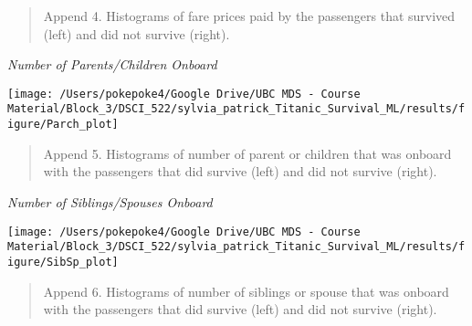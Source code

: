 \documentclass[]{article}
\begin{document}
\begin{quote}
Append 4. Histograms of fare prices paid by the passengers that survived
(left) and did not survive (right).
\end{quote}

\newpage

\emph{Number of Parents/Children Onboard}

\begin{center}\texttt{[image: /Users/pokepoke4/Google Drive/UBC MDS - Course Material/Block\_3/DSCI\_522/sylvia\_patrick\_Titanic\_Survival\_ML/results/figure/Parch\_plot]} \end{center}

\begin{quote}
Append 5. Histograms of number of parent or children that was onboard
with the passengers that did survive (left) and did not survive (right).
\end{quote}

\newpage

\emph{Number of Siblings/Spouses Onboard}

\begin{center}\texttt{[image: /Users/pokepoke4/Google Drive/UBC MDS - Course Material/Block\_3/DSCI\_522/sylvia\_patrick\_Titanic\_Survival\_ML/results/figure/SibSp\_plot]} \end{center}

\begin{quote}
Append 6. Histograms of number of siblings or spouse that was onboard
with the passengers that did survive (left) and did not survive (right).
\end{quote}
\end{document}
